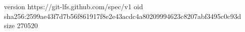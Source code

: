 version https://git-lfs.github.com/spec/v1
oid sha256:2599ae43f7d7b56f861917f8e2e43acdc4a80209994623c8207abf3495c0c93d
size 270520
